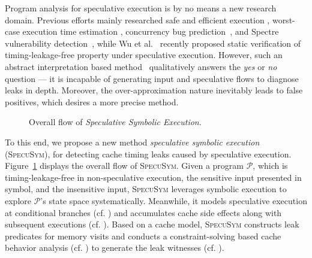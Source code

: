 \documentclass[sigconf]{acmart}
\newcommand\ignore[1]{}
\newcommand*\circled[1]{\tikz[baseline=(char.base)]{
				\node[shape=circle,draw,inner sep=1pt] (char) {\scriptsize{#1}};}}
\newcommand{\prog}{\mathcal{P}}
\begin{document}
Program analysis for speculative execution is by no means a new research domain. 
Previous efforts mainly researched safe and efficient execution
\cite{ChenLDHY04,PrabhuRV10,GuarnieriKMRS19}, worst-case execution time estimation
\cite{LiMR03,LiMR05}, concurrency bug prediction~\cite{ChenWYS09,LiELS05}, and 
Spectre vulnerability detection~\cite{GuarnieriKMRS19,OleksenkoTSF19,WangCBMR19}, 
while Wu et al.~\cite{WuW19} recently proposed static verification of timing-leakage-free 
property under speculative execution. However, such an abstract interpretation based 
method~\cite{WuW19} qualitatively answers the \textit{yes} or \textit{no} question 
--- it is incapable of generating input and speculative flows to diagnose leaks in 
depth. Moreover, the over-approximation nature inevitably leads to false positives, 
which desires a more precise method.



\begin{figure}
  \centering
  \scalebox{1.0}{}
  \caption{Overall flow of \emph{Speculative Symbolic Execution}.}
  \label{fig:overall_flow}
\end{figure}



To this end, we propose a new method \textit{speculative symbolic execution}
(\textsc{SpecuSym}), for detecting cache timing leaks caused by speculative execution. 
Figure~\ref{fig:overall_flow} displays the overall flow of \textsc{SpecuSym}. Given
a program $\prog$, which is timing-leakage-free in non-speculative execution, the 
sensitive input presented in symbol, and the insensitive input, \textsc{SpecuSym} 
leverages symbolic execution to explore $\prog$'s state space systematically. Meanwhile, 
it models speculative execution at conditional branches (cf. \circled{1}) and accumulates 
cache side effects along with subsequent executions (cf. \circled{2}). Based on a cache 
model, \textsc{SpecuSym} constructs leak predicates for memory visits and conducts a
constraint-solving based cache behavior analysis (cf. \circled{3}) to generate the leak 
witnesses (cf. \circled{4}). 


\ignore{
To be specific, the symbolic input reflects the leaks that 
are relevant to secret, the speculative execution modeling supplies behavioral 
simulation on program paths, the cache modeling forms leak exposure constraints 
while the the cache analysis discloses divergent cache behaviors at an identified 
execution flow. 
}
\end{document}

